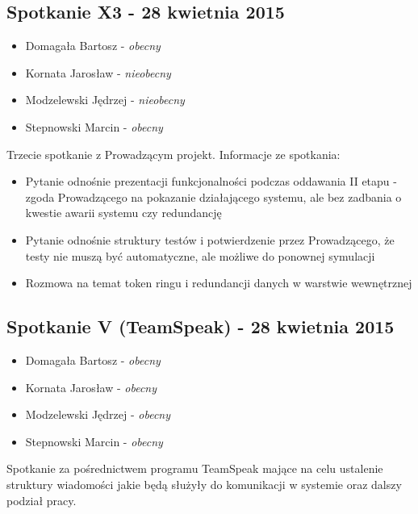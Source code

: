 \subsection[Spotkanie X3 - 28 kwietnia 2015]{Spotkanie X3 - 28 kwietnia 2015}

\begin{itemize}
\item Domagała Bartosz - \textit{obecny}
\item Kornata Jarosław - \textit{nieobecny}
\item Modzelewski Jędrzej - \textit{nieobecny}
\item Stepnowski Marcin - \textit{obecny}
\end{itemize}

\par{Trzecie spotkanie z Prowadzącym projekt. Informacje ze spotkania:}

\begin{itemize}
\item Pytanie odnośnie prezentacji funkcjonalności podczas oddawania II etapu - zgoda Prowadzącego na pokazanie działającego systemu, ale bez zadbania o kwestie awarii systemu czy redundancję
\item Pytanie odnośnie struktury testów i potwierdzenie przez Prowadzącego, że testy nie muszą być automatyczne, ale możliwe do ponownej symulacji
\item Rozmowa na temat token ringu i redundancji danych w warstwie wewnętrznej

\end{itemize}

\subsection[Spotkanie V (TeamSpeak)- 28 kwietnia 2015]{Spotkanie V (TeamSpeak) - 28 kwietnia 2015}

\begin{itemize}
\item Domagała Bartosz - \textit{obecny}
\item Kornata Jarosław - \textit{obecny}
\item Modzelewski Jędrzej - \textit{obecny}
\item Stepnowski Marcin - \textit{obecny}
\end{itemize}

\par{Spotkanie za pośrednictwem programu TeamSpeak mające na celu ustalenie struktury wiadomości jakie będą służyły do komunikacji w systemie oraz dalszy podział pracy.}

